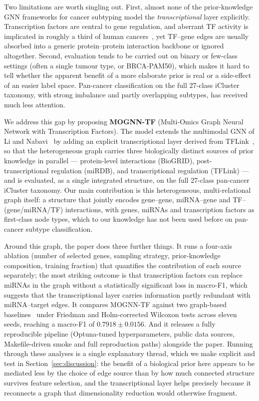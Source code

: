 \documentclass[review,3p,times,11pt, ]{elsarticle} %
\begin{document}
Two limitations are worth singling out. First, almost none of the prior-knowledge GNN frameworks for cancer subtyping model the \emph{transcriptional} layer explicitly. Transcription factors are central to gene regulation, and aberrant TF activity is implicated in roughly a third of human cancers~\cite{belova_pancancer_grn_2025}, yet TF--gene edges are usually absorbed into a generic protein--protein interaction backbone or ignored altogether. Second, evaluation tends to be carried out on binary or few-class settings (often a single tumour type, or BRCA-PAM50), which makes it hard to tell whether the apparent benefit of a more elaborate prior is real or a side-effect of an easier label space. Pan-cancer classification on the full 27-class iCluster taxonomy, with strong imbalance and partly overlapping subtypes, has received much less attention.

We address this gap by proposing \textbf{MOGNN-TF} (Multi-Omics Graph Neural Network with Transcription Factors). The model extends the multimodal GNN of Li and Nabavi~\cite{li_multimodal_2024} by adding an explicit transcriptional layer derived from TFLink~\cite{liska_tflink_2022}, so that the heterogeneous graph carries three biologically distinct sources of prior knowledge in parallel — protein-level interactions (BioGRID), post-transcriptional regulation (miRDB), and transcriptional regulation (TFLink) — and is evaluated, as a single integrated structure, on the full 27-class pan-cancer iCluster taxonomy. Our main contribution is this heterogeneous, multi-relational graph itself: a structure that jointly encodes gene--gene, miRNA--gene and TF--(gene/miRNA/TF) interactions, with genes, miRNAs and transcription factors as first-class node types, which to our knowledge has not been used before on pan-cancer subtype classification.

Around this graph, the paper does three further things. It runs a four-axis ablation (number of selected genes, sampling strategy, prior-knowledge composition, training fraction) that quantifies the contribution of each source separately; the most striking outcome is that transcription factors can replace miRNAs in the graph without a statistically significant loss in macro-F1, which suggests that the transcriptional layer carries information partly redundant with miRNA--target edges. It compares MOGNN-TF against two graph-based baselines~\cite{li_multimodal_2024,li_mogcn_2022} under Friedman and Holm-corrected Wilcoxon tests across eleven seeds, reaching a macro-F1 of $0.7918 \pm 0.0156$. And it releases a fully reproducible pipeline (Optuna-tuned hyperparameters, public data sources, Makefile-driven smoke and full reproduction paths) alongside the paper. Running through these analyses is a single explanatory thread, which we make explicit and test in Section~\ref{sec:discussion}: the benefit of a biological prior here appears to be mediated less by the choice of edge source than by how much connected structure survives feature selection, and the transcriptional layer helps precisely because it reconnects a graph that dimensionality reduction would otherwise fragment.
\end{document}
